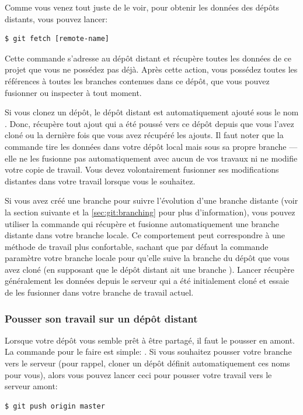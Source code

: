 Comme vous venez tout juste de le voir, pour obtenir les données des dépôts distants, vous pouvez lancer:
\begin{Schunk}
\begin{Verbatim}
$ git fetch [remote-name]
\end{Verbatim}
\end{Schunk}

Cette commande s'adresse au dépôt distant et récupère toutes les données de ce projet que vous ne possédez pas déjà.
Après cette action, vous possédez toutes les références à toutes les branches contenues dans ce dépôt, que vous pouvez fusionner ou inspecter à tout moment.

Si vous clonez un dépôt, le dépôt distant est automatiquement ajouté sous le nom .
Donc,  récupère tout ajout qui a été poussé vers ce dépôt depuis que vous l'avez cloné ou la dernière fois que vous avez récupéré les ajouts.
Il faut noter que la commande  tire les données dans votre dépôt local mais sous sa propre branche --- elle ne les fusionne pas automatiquement avec aucun de vos travaux ni ne modifie votre copie de travail.
Vous devez volontairement fusionner ses modifications distantes dans votre travail lorsque vous le souhaitez.

Si vous avez créé une branche pour suivre l'évolution d'une branche distante (voir
la section suivante et la \autoref{sec:git:branching} pour plus d'information), vous pouvez utiliser la commande  qui récupère et fusionne automatiquement une branche distante dans votre branche locale.
Ce comportement peut correspondre à une méthode de travail plus confortable, sachant que par défaut la commande  paramètre votre branche locale pour qu'elle suive la branche  du dépôt que vous avez cloné (en supposant que le dépôt distant ait une branche ).
Lancer  récupère généralement les données depuis le serveur qui a été initialement cloné et essaie de les fusionner dans votre branche de travail actuel.

\subsubsection{Pousser son travail sur un dépôt distant}
\label{sec:git:pushing_remotes}

Lorsque votre dépôt vous semble prêt à être partagé, il faut le pousser en amont.
La commande pour le faire est simple: .
Si vous souhaitez pousser votre branche  vers le serveur  (pour rappel, cloner un dépôt définit automatiquement ces noms pour vous), alors vous pouvez lancer ceci pour pousser votre travail vers le serveur amont:
\begin{Schunk}
\begin{Verbatim}
$ git push origin master
\end{Verbatim}
\end{Schunk}

